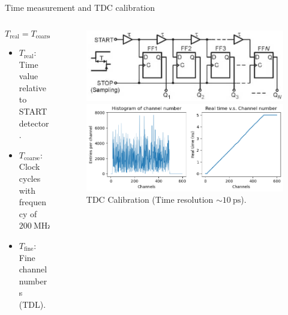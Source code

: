 \documentclass{ikpKoeln}
\begin{document}
\begin{frame}[t]{Time measurement and TDC calibration}
\begin{columns}
\begin{column}{0.45 \textwidth}
			\vspace{-0.5em}
			$$T_\text{real} = T_\text{coarse} - T_\text{fine}$$
			\vspace{-1em}
			\small
			{
				\begin{itemize}
					\item $T_\text{real}$: Time value relative to START detector.
					\item $T_\text{coarse}$: Clock cycles with frequency of $\qty{200}{\MHz}$
					\item $T_\text{fine}$: Fine channel numbers (TDL).
				\end{itemize}
			}
		\end{column}
		\begin{column}{0.5 \textwidth}
			\begin{figure}
				\captionsetup{labelformat=empty}
				\vspace{-0.8em}\includegraphics[width = \textwidth]{r3b/TDCFineTime}
				\caption{\scriptsize Tapped Delay Line (TDL)\footcite{TDCFINETIME}.}
				\includegraphics[width = \textwidth]{neuland/FineTimeCal}
				\caption{\scriptsize TDC Calibration (Time resolution $\sim \qty{10}{\pico\second}$).}
			\end{figure}
			\vspace*{-1.5em}
		\end{column}
	\end{columns}
\end{frame}
\end{document}
